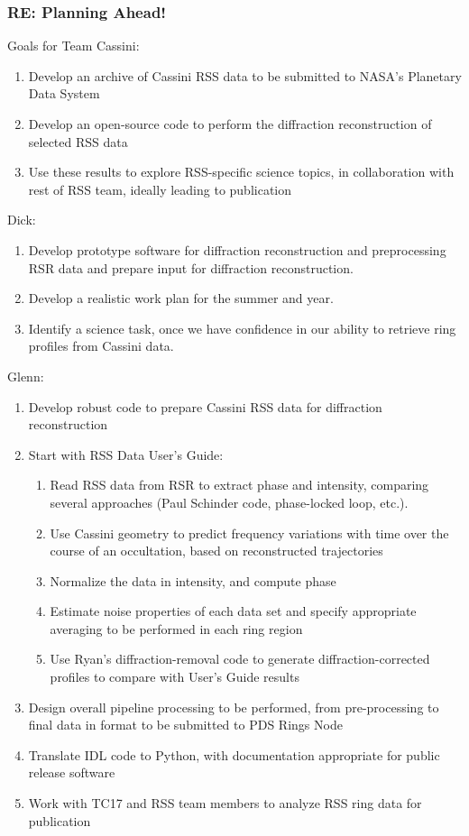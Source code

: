 \documentclass[crop=false,class=book]{standalone}
\begin{document}
\subsubsection{\footnotesize RE: Planning Ahead!}
Goals for Team Cassini:
\begin{enumerate}
    \item Develop an archive of Cassini RSS data to be submitted to NASA's Planetary Data System
    \item Develop an open-source code to perform the diffraction reconstruction of selected RSS data
    \item Use these results to explore RSS-specific science topics, in collaboration with rest of RSS team, ideally leading to publication
\end{enumerate}
Dick:
\begin{enumerate}
    \item Develop prototype software for diffraction reconstruction and preprocessing RSR data and prepare input for diffraction reconstruction.
    \item Develop a realistic work plan for the summer and year.
    \item Identify a science task, once we have confidence in our ability to retrieve ring profiles from Cassini data.
\end{enumerate}
Glenn:
\begin{enumerate}
    \item Develop robust code to prepare Cassini RSS data for diffraction reconstruction
    \item Start with RSS Data User's Guide:
    \begin{enumerate}
        \item Read RSS data from RSR to extract phase and intensity, comparing several approaches (Paul Schinder code, phase-locked loop, etc.).
        \item Use Cassini geometry to predict frequency variations with time over the course of an occultation, based on reconstructed trajectories
        \item Normalize the data in intensity, and compute phase
        \item Estimate noise properties of each data set and specify appropriate averaging to be performed in each ring region
        \item Use Ryan's diffraction-removal code to generate diffraction-corrected profiles to compare with User's Guide results
    \end{enumerate}
    \item Design overall pipeline processing to be performed, from pre-processing to final data in format to be submitted to PDS Rings Node
    \item Translate IDL code to Python, with documentation appropriate for public release software
    \item Work with TC17 and RSS team members to analyze RSS ring data for publication
\end{enumerate}
\end{document}

